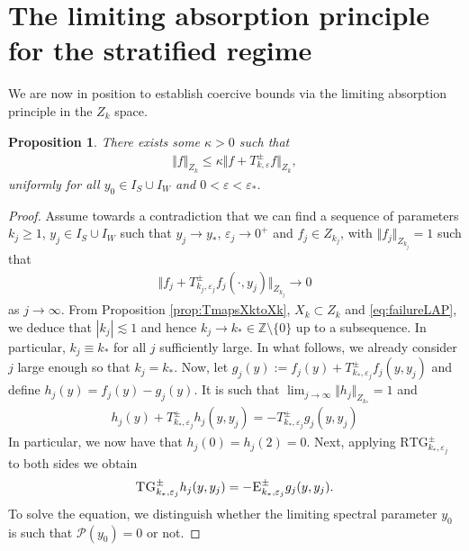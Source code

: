 \documentclass[11pt,reqno]{amsproc}
\newtheorem{proposition}{Proposition}[section]
\theoremstyle{definition}
\numberwithin{equation}{section}
\newcommand{\ep}{\varepsilon}
\renewcommand{\P}{{\mathcal{P}}}
\begin{document}
\section{The limiting absorption principle for the stratified regime}\label{sec:LAPstrat}
We are now in position to establish coercive bounds via the limiting absorption principle in the $Z_k$ space.
\begin{proposition}\label{prop:LAPZk}
There exists some $\kappa>0$ such that
\begin{align*}
\Vert f \Vert_{Z_k} \leq \kappa \Vert f + T_{k,\ep}^\pm f \Vert_{Z_k},
\end{align*}
uniformly for all $y_0\in I_S\cup I_W$ and $0<\ep<\ep_*$.
\end{proposition}

\begin{proof}
Assume towards a contradiction that we can find a sequence of parameters $k_j\geq 1$, $y_j\in I_S\cup I_W$ such that $y_j\rightarrow y_*$, $\ep_j\rightarrow 0^+$ and $f_j\in Z_{k_j}$, with $\Vert f_j\Vert_{Z_{k_j}}=1$ such that 
\begin{align}\label{eq:failureLAP}
\Vert f_j + T_{k_j,\ep_j}^\pm f_j(\cdot,y_j)\Vert_{Z_{k_j}} \rightarrow 0
\end{align}
as $j\rightarrow \infty$. From Proposition \ref{prop:TmapsXktoXk}, $X_k\subset Z_k$ and \eqref{eq:failureLAP}, we deduce that $|k_j|\lesssim 1$ and hence $k_j\rightarrow k_*\in \mathbb{Z}\setminus \lbrace 0 \rbrace$ up to a subsequence. In particular, $k_j \equiv k_*$ for all $j$ sufficiently large. In what follows, we already consider $j$ large enough so that $k_j=k_*$. Now, let $g_j(y):=f_j(y) + T_{k_*,\ep_j}^\pm f_j(y,y_j)$ and define $h_j(y) = f_j(y) - g_j(y)$. It is such that $\lim_{j\rightarrow \infty} \Vert h_j \Vert_{Z_{k_*}}=1$ and
\begin{align}\label{eq:defRj}
h_j(y) + T_{k_*,\ep_j}^\pm h_j(y,y_j) = -T_{k_*,\ep_j}^\pm g_j(y,y_j) 
\end{align}
In particular, we now have that $h_j(0)=h_j(2)=0$. Next, applying $\text{RTG}_{k_*,\ep_j}^\pm$ to both sides we obtain
\begin{equation}\label{eq:TGhj}
\textsc{TG}_{k_*,\ep_j}^\pm h_j(y,y_j) = -\textsc{E}_{k_*,\ep_j}^\pm g_j(y,y_j).
\end{equation}
To solve the equation, we distinguish whether the limiting spectral parameter $y_0$ is such that $\P(y_0)=0$ or not.


\end{proof}
\end{document}
